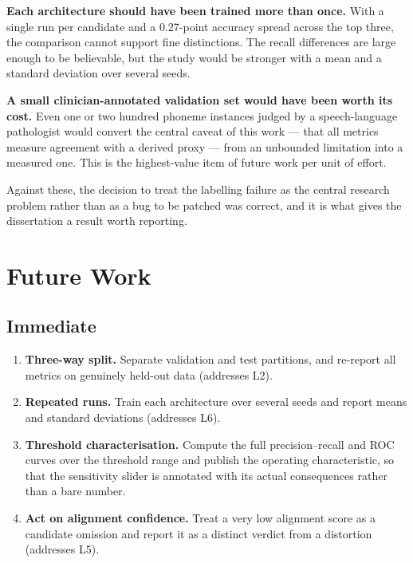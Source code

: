 \textbf{Each architecture should have been trained more than once.} With a
single run per candidate and a 0.27-point accuracy spread across the top three,
the comparison cannot support fine distinctions. The recall differences are
large enough to be believable, but the study would be stronger with a mean and a
standard deviation over several seeds.

\textbf{A small clinician-annotated validation set would have been worth its
cost.} Even one or two hundred phoneme instances judged by a speech-language
pathologist would convert the central caveat of this work --- that all metrics
measure agreement with a derived proxy --- from an unbounded limitation into a
measured one. This is the highest-value item of future work per unit of effort.

Against these, the decision to treat the labelling failure as the central
research problem rather than as a bug to be patched was correct, and it is what
gives the dissertation a result worth reporting.

\section{Future Work}
\label{sec:future}

\subsection{Immediate}

\begin{enumerate}[leftmargin=*]
  \item \textbf{Three-way split.} Separate validation and test partitions, and
        re-report all metrics on genuinely held-out data (addresses L2).
  \item \textbf{Repeated runs.} Train each architecture over several seeds and
        report means and standard deviations (addresses L6).
  \item \textbf{Threshold characterisation.} Compute the full precision--recall
        and ROC curves over the threshold range and publish the operating
        characteristic, so that the sensitivity slider is annotated with its
        actual consequences rather than a bare number.
  \item \textbf{Act on alignment confidence.} Treat a very low alignment score
        as a candidate omission and report it as a distinct verdict from a
        distortion (addresses L5).
\end{enumerate}

